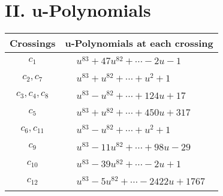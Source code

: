 \documentclass[1p]{elsarticle_modified}
\theoremstyle{definition}
\begin{document}
\newpage\renewcommand{\arraystretch}{1}
\centering \section*{ II. u-Polynomials}
\begin{tabular}{m{50pt}|m{274pt}}
Crossings & \hspace{64pt}u-Polynomials at each crossing \\
\hline $$\begin{aligned}c_{1}\end{aligned}$$&$\begin{aligned}
&u^{83}+47 u^{82}+\cdots-2 u-1
\end{aligned}$\\
\hline $$\begin{aligned}c_{2},c_{7}\end{aligned}$$&$\begin{aligned}
&u^{83}+u^{82}+\cdots+u^2+1
\end{aligned}$\\
\hline $$\begin{aligned}c_{3},c_{4},c_{8}\end{aligned}$$&$\begin{aligned}
&u^{83}- u^{82}+\cdots+124 u+17
\end{aligned}$\\
\hline $$\begin{aligned}c_{5}\end{aligned}$$&$\begin{aligned}
&u^{83}+u^{82}+\cdots+450 u+317
\end{aligned}$\\
\hline $$\begin{aligned}c_{6},c_{11}\end{aligned}$$&$\begin{aligned}
&u^{83}- u^{82}+\cdots+u^2+1
\end{aligned}$\\
\hline $$\begin{aligned}c_{9}\end{aligned}$$&$\begin{aligned}
&u^{83}-11 u^{82}+\cdots+98 u-29
\end{aligned}$\\
\hline $$\begin{aligned}c_{10}\end{aligned}$$&$\begin{aligned}
&u^{83}-39 u^{82}+\cdots-2 u+1
\end{aligned}$\\
\hline $$\begin{aligned}c_{12}\end{aligned}$$&$\begin{aligned}
&u^{83}-5 u^{82}+\cdots-2422 u+1767
\end{aligned}$\\
\hline
\end{tabular}\newpage\renewcommand{\arraystretch}{1}
\end{document}
